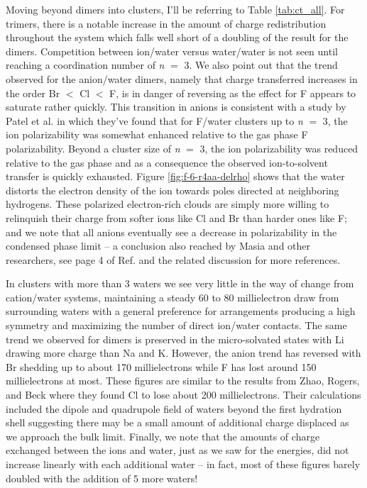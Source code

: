 \begin{sie}
  Moving beyond dimers into clusters, I'll be referring to Table \ref{tab:ct_all}. For trimers, there is a notable increase
  in the amount of charge redistribution throughout the system which falls well short of a doubling of the result for the dimers. Competition between ion/water
  versus water/water is not seen until reaching a coordination number of \emph{n} $=$ 3. We also point out that the trend observed for the anion/water dimers, 
  namely that charge transferred increases in the order Br\sur{-} $<$ Cl\sur{-} $<$ F\sur{-}, is in danger of reversing as the effect for F\sur{-} appears to 
  saturate rather quickly. This transition in anions is consistent with a study by Patel et al. in which they've found that for F\sur{-}/water clusters up to 
  \emph{n} $=$ 3, the ion polarizability was somewhat enhanced relative to the gas phase F\sur{-} polarizability\cite{patel2010polarizability}. Beyond a cluster 
  size of \emph{n} $=$ 3, the ion polarizability was reduced relative to the gas phase and as a consequence the observed ion-to-solvent transfer is quickly exhausted. 
  Figure \ref{fig:f-6-r4aa-delrho} shows that the water distorts the electron density of the ion towards poles directed at neighboring hydrogens. These polarized 
  electron-rich clouds are simply more willing to relinquish their charge from softer ions like Cl\sur{-} and Br\sur{-} than harder ones like F\sur{-}; and we 
  note that all anions eventually see a decrease in polarizability in the condensed phase limit -- a conclusion also reached by Masia\cite{masia2009polarize,masia2013polar} 
  and other researchers, see page 4 of Ref. \cite{ren2003amoeba} and the related discussion for more references.

  In clusters with more than 3 waters we see very little in the way of change from cation/water systems, maintaining a steady 60 to 80 millielectron draw from
  surrounding waters with a general preference for arrangements producing a high symmetry and maximizing the number of direct ion/water contacts. The same trend
  we observed for dimers is preserved in the micro-solvated states with Li\sur{+} drawing more charge than Na\sur{+} and K\sur{+}. However, the anion trend has
  reversed with Br\sur{-} shedding up to about 170 millielectrons while F\sur{-} has lost around 150 millielectrons at most. These figures are similar to the 
  results from Zhao, Rogers, and Beck where they found Cl\sur{-} to lose about 200 millielectrons\cite{rogers2010ctpolar}. Their calculations included the dipole 
  and quadrupole field of waters beyond the first hydration shell suggesting there may be a small amount of additional charge displaced as we approach the bulk
  limit. Finally, we note that the amounts of charge exchanged between the ions and water, just as we saw for the energies, did not increase linearly with each
  additional water -- in fact, most of these figures barely doubled with the addition of 5 more waters!


\end{sie}

